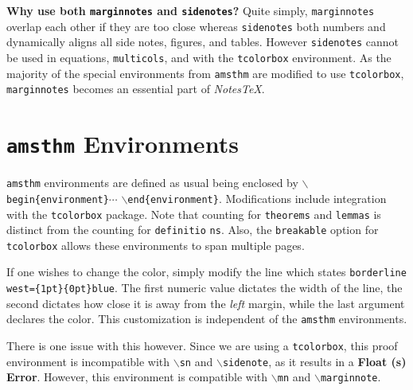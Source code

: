 \documentclass[10pt]{article}
\begin{document}
\begin{remark}\textbf{Why use both \texttt{marginnotes} and \texttt{sidenotes}?}
	Quite simply, \texttt{marginnotes} overlap each other if they are too close whereas \texttt{sidenotes} both numbers and dynamically aligns all side notes, figures, and tables. However \texttt{sidenotes} cannot be used in equations, \texttt{multicols}, and with the \texttt{tcolorbox} environment. As the majority of the special environments from \texttt{amsthm} are modified to use \texttt{tcolorbox}, \texttt{marginnotes} becomes an essential part of \textit{NotesTeX}.
\end{remark}


\section{\texttt{amsthm} Environments}\label{Sub:Special}
\texttt{amsthm} environments are defined as usual being enclosed by \texttt{\( \backslash \)begin\{environment\}}\( \cdots \) \texttt{\( \backslash \)end\{environment\}}. Modifications include integration with the \texttt{tcolorbox} package. Note that counting for \texttt{theorems} and \texttt{lemmas} is distinct from the counting for \texttt{definitio} \texttt{ns}. Also, the \texttt{breakable} option for \texttt{tcolorbox} allows these environments to span multiple pages.

If one wishes to change the color, simply modify the line which states \texttt{borderline west=\{1pt\}}\texttt{\{0pt\}\textbraceleft{}blue\textbraceright{}}. The first numeric value dictates the width of the line, the second dictates how close it is away from the \textit{left} margin, while the last argument declares the color. This customization is independent of the \texttt{amsthm} environments.

There is one issue with this however. Since we are using a \texttt{tcolorbox}, this proof environment is incompatible with \texttt{\( \backslash \)sn} and \texttt{\( \backslash \)sidenote}, as it results in a \textbf{Float (s) Error}. However, this environment is compatible with \texttt{\( \backslash \)mn} and \texttt{\( \backslash \)marginnote}.
\end{document}
